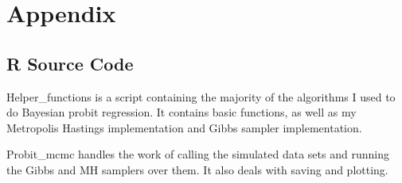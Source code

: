 \documentclass[12pt]{article}
\begin{document}
\newpage
\section{Appendix}
\subsection*{R Source Code}
Helper\_functions is a script containing the majority of the algorithms I used to do Bayesian probit regression. It contains basic functions, as well as my Metropolis Hastings implementation and Gibbs sampler implementation.


\newpage
Probit\_mcmc handles the work of calling the simulated data sets and running the Gibbs and MH samplers over them. It also deals with saving and plotting.

\end{document}
